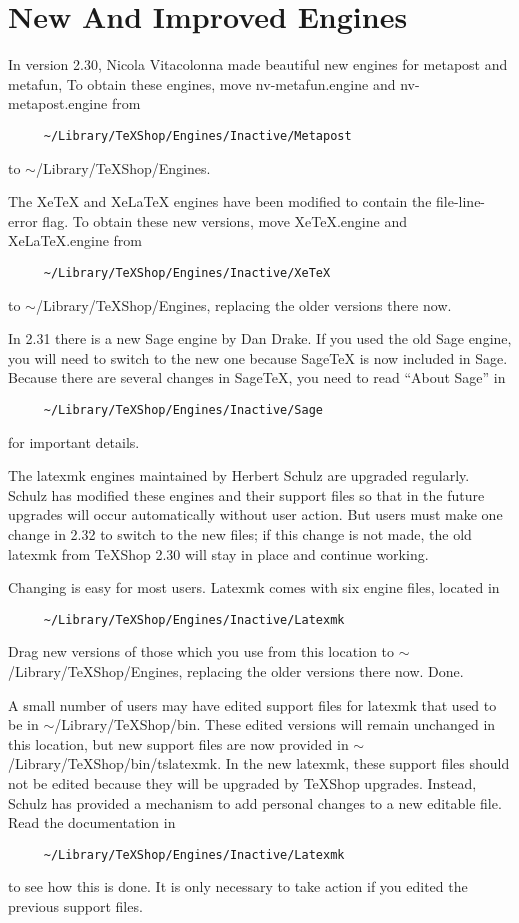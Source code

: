 \documentclass[11pt, oneside]{amsart}
\begin{document}
\section{New And Improved Engines}

In version 2.30, Nicola Vitacolonna made beautiful new engines for metapost and metafun,  To obtain these engines, move nv-metafun.engine and nv-metapost.engine from 
\begin{verbatim}
     ~/Library/TeXShop/Engines/Inactive/Metapost
\end{verbatim}
to $\sim$/Library/TeXShop/Engines.

The XeTeX and XeLaTeX engines have been modified to contain the file-line-error flag. To obtain these new versions, move XeTeX.engine and XeLaTeX.engine from
\begin{verbatim}
     ~/Library/TeXShop/Engines/Inactive/XeTeX
\end{verbatim}
to $\sim$/Library/TeXShop/Engines, replacing the older versions there now.

In 2.31 there is a new Sage engine by Dan Drake. If you used the old Sage engine, you will need to switch to the new one because SageTeX is now included in Sage. Because there are several changes in SageTeX, you need to read ``About Sage'' in 
\begin{verbatim}
     ~/Library/TeXShop/Engines/Inactive/Sage
\end{verbatim}
for important details.

The latexmk engines maintained by Herbert Schulz are upgraded regularly. Schulz has modified these engines and their support files so that in the future upgrades will occur automatically without user action. But users must make one change in 2.32 to switch to the new files; if this change is not made, the old latexmk from TeXShop 2.30 will stay in place and continue working. 

Changing is easy for most users. Latexmk comes with six engine files, located in 
\begin{verbatim}
     ~/Library/TeXShop/Engines/Inactive/Latexmk
\end{verbatim}
Drag new versions of those which you use from this location to $\sim$/Library/TeXShop/Engines, replacing the older versions there now. Done.

A small number of users may have edited support files  for latexmk that used to be in $\sim$/Library/TeXShop/bin. These edited versions will remain unchanged in this location, but new support files are now provided in $\sim$/Library/TeXShop/bin/tslatexmk. In the new latexmk, these support files should not be edited because they will be upgraded by TeXShop upgrades. Instead, Schulz has provided a mechanism to add personal changes to a new editable file. Read the documentation in 
\begin{verbatim}
     ~/Library/TeXShop/Engines/Inactive/Latexmk
\end{verbatim}
to see how this is done. It is only necessary to take action if you edited the previous support files.
\end{document}
